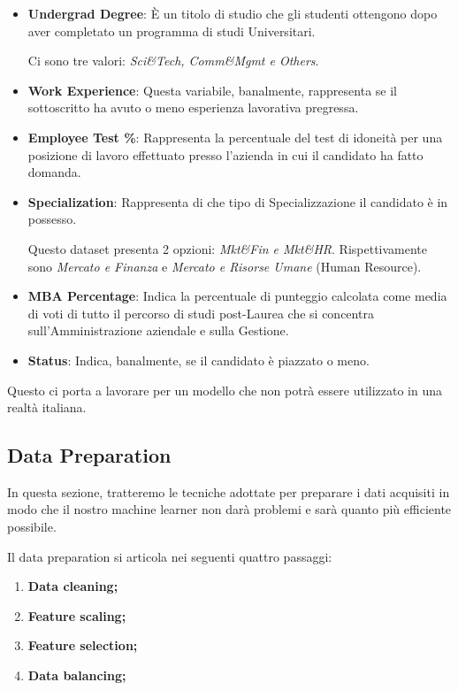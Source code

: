 \documentclass[12pt]{article}
\begin{document}
\begin{itemize}
    \item \textbf{Undergrad Degree}: È un titolo di studio che gli studenti ottengono dopo aver completato un programma di studi Universitari. \par Ci sono tre valori: \textit{Sci\&Tech, Comm\&Mgmt e Others}.
    \item \textbf{Work Experience}: Questa variabile, banalmente, rappresenta se il sottoscritto ha avuto o meno esperienza lavorativa pregressa.
    \item \textbf{Employee Test \%}: Rappresenta la percentuale del test di idoneità per una posizione di lavoro effettuato presso l'azienda in cui il candidato ha fatto domanda.
    \item \textbf{Specialization}: Rappresenta di che tipo di Specializzazione il candidato è in possesso. \par Questo dataset presenta 2 opzioni: \textit{Mkt\&Fin e Mkt\&HR}. Rispettivamente sono \textit{Mercato e Finanza} e \textit{Mercato e Risorse Umane} (Human Resource).
    \item \textbf{MBA Percentage}: Indica la percentuale di punteggio calcolata come media di voti di tutto il percorso di studi post-Laurea che si concentra sull'Amministrazione aziendale e sulla Gestione.
    \item \textbf{Status}: Indica, banalmente, se il candidato è piazzato o meno.
\end{itemize}

Questo ci porta a lavorare per un modello che non potrà essere utilizzato in una realtà italiana.

\newpage

\subsection{Data Preparation}
In questa sezione, tratteremo le tecniche adottate per preparare i dati acquisiti in modo che il nostro machine learner
non darà problemi e sarà quanto più efficiente possibile.

Il data preparation si articola nei seguenti quattro passaggi:

\begin{enumerate}
    \item \textbf{Data cleaning;}
    \item \textbf{Feature scaling;}
    \item \textbf{Feature selection;}
    \item \textbf{Data balancing;}
\end{enumerate}
\end{document}
